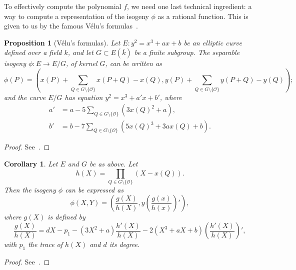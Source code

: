 \documentclass[10pt]{article}
\theoremstyle{plain}
\newtheorem{corollary}[theorem]{Corollary}
\newtheorem{proposition}[theorem]{Proposition}
\theoremstyle{definition}
\def\O{\ensuremath{\mathcal{O}}}
\begin{document}
To effectively compute the polynomial $f$, we need one last technical
ingredient: a way to compute a representation of the isogeny $ϕ$ as a
rational function. %
This is given to us by the famous V\'elu's formulas~\cite{velu71}.

\begin{proposition}[V\'elu's formulas]
  \label{th:velu}
  Let $E:y^2=x^3+ax+b$ be an elliptic curve defined over a field $k$,
  and let $G⊂E(\bar{k})$ be a finite subgroup. %
  The separable isogeny $ϕ:E\to E/G$, of kernel $G$, can be written as
  \begin{equation*}
    ϕ(P) = \left(
      x(P) + \sum_{Q∈G\setminus\{\O\}}x(P+Q)-x(Q),
      y(P) + \sum_{Q∈G\setminus\{\O\}}y(P+Q)-y(Q)
    \right);
  \end{equation*} %
  and the curve $E/G$ has equation $y^2=x^3+a'x+b'$, where
  \begin{align*}
    a' &= a - 5\sum_{Q∈G\setminus\{\O\}}(3x(Q)^2+a),\\
    b' &= b - 7\sum_{Q∈G\setminus\{\O\}}(5x(Q)^3+3ax(Q)+b).
  \end{align*}
\end{proposition}
\begin{proof}
  See~\cite[\S8.2]{df+thesis}.
\end{proof}

\begin{corollary}
  Let $E$ and $G$ be as above. %
  Let
  \[h(X) = \prod_{Q∈G\setminus\{\O\}}(X-x(Q)).\]
  Then the isogeny $ϕ$ can be expressed as
  \[ϕ(X,Y) = \left(\frac{g(X)}{h(X)}, y\left(\frac{g(x)}{h(x)}\right)'\right),\]
  where $g(X)$ is defined by
  \[\frac{g(X)}{h(X)} = dX-p_1-(3X^2+a)\frac{h'(X)}{h(X)}
    - 2(X^3+aX+b)\left(\frac{h'(X)}{h(X)}\right)',\]
  with $p_1$ the trace of $h(X)$ and $d$ its degree.
\end{corollary}
\begin{proof}
  See~\cite[\S8.2]{df+thesis}.
\end{proof}
\end{document}
